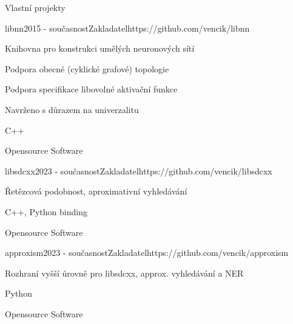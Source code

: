 \documentclass{resume} %
\begin{document}
\begin{rSection}{Vlastn\'{i} projekty}
\begin{rSubsection}{libnn}{2015 - sou\v{c}asnost}{Zakladatel}{https://github.com/vencik/libnn}
\item Knihovna pro konstrukci um\v{e}l\'{y}ch neuronov\'{y}ch s\'{i}t\'{i}
\item Podpora obecn\'{e} (cyklick\'{e} grafov\'{e}) topologie
\item Podpora specifikace libovoln\'{e} aktiva\v{c}n\'{i} funkce
\item Navr\v{z}eno s d\r{u}razem na univerzalitu
\item C++
\item Opensource Software
\end{rSubsection}

\begin{rSubsection}{libsdcxx}{2023 - sou\v{c}asnost}{Zakladatel}{https://github.com/vencik/libsdcxx}
\item \v{R}et\v{e}zcov\'{a} podobnost, aproximativn\'{i} vyhled\'{a}v\'{a}n\'{i}
\item C++, Python binding
\item Opensource Software
\end{rSubsection}

\begin{rSubsection}{approxism}{2023 - sou\v{c}asnost}{Zakladatel}{https://github.com/vencik/approxism}
\item Rozhran\'{i} vy\v{s}\v{s}\'{i} \'{u}rovn\v{e} pro libsdcxx, approx. vyhled\'{a}v\'{a}n\'{i} a NER
\item Python
\item Opensource Software
\end{rSubsection}

\end{rSection}

\end{document}
